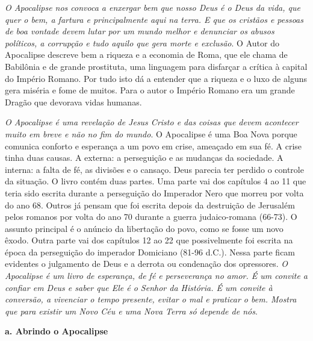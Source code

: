 \documentclass[
]{book}
\begin{document}
\emph{O Apocalipse nos convoca a enxergar bem que nosso Deus é o Deus da vida, que quer o bem, a fartura e principalmente aqui na terra. E que os cristãos e pessoas de boa vontade devem lutar por um mundo melhor e denunciar os abusos políticos, a corrupção e tudo aquilo que gera morte e exclusão}. O Autor do Apocalipse descreve bem a riqueza e a economia de Roma, que ele chama de Babilônia e de grande prostituta, uma linguagem para disfarçar a crítica à capital do Império Romano. Por tudo isto dá a entender que a riqueza e o luxo de alguns gera miséria e fome de muitos. Para o autor o Império Romano era um grande Dragão que devorava vidas humanas.

\emph{O Apocalipse é uma revelação de Jesus Cristo e das coisas que devem acontecer muito em breve e não no fim do mundo}. O Apocalipse é uma Boa Nova porque comunica conforto e esperança a um povo em crise, ameaçado em sua fé. A crise tinha duas causas. A externa: a perseguição e as mudanças da sociedade. A interna: a falta de fé, as divisões e o cansaço. Deus parecia ter perdido o controle da situação. O livro contém duas partes. Uma parte vai dos capítulos 4 ao 11 que teria sido escrita durante a perseguição do Imperador Nero que morreu por volta do ano 68. Outros já pensam que foi escrita depois da destruição de Jerusalém pelos romanos por volta do ano 70 durante a guerra judaico-romana (66-73). O assunto principal é o anúncio da libertação do povo, como se fosse um novo êxodo. Outra parte vai dos capítulos 12 ao 22 que possivelmente foi escrita na época da perseguição do imperador Domiciano (81-96 d.C.). Nessa parte ficam evidentes o julgamento de Deus e a derrota ou condenação dos opressores. \emph{O Apocalipse é um livro de esperança, de fé e perseverança no amor. É um convite a confiar em Deus e saber que Ele é o Senhor da História. É um convite à conversão, a vivenciar o tempo presente, evitar o mal e praticar o bem. Mostra que para existir um Novo Céu e uma Nova Terra só depende de nós}.

\textbf{a. Abrindo o Apocalipse}
\end{document}
